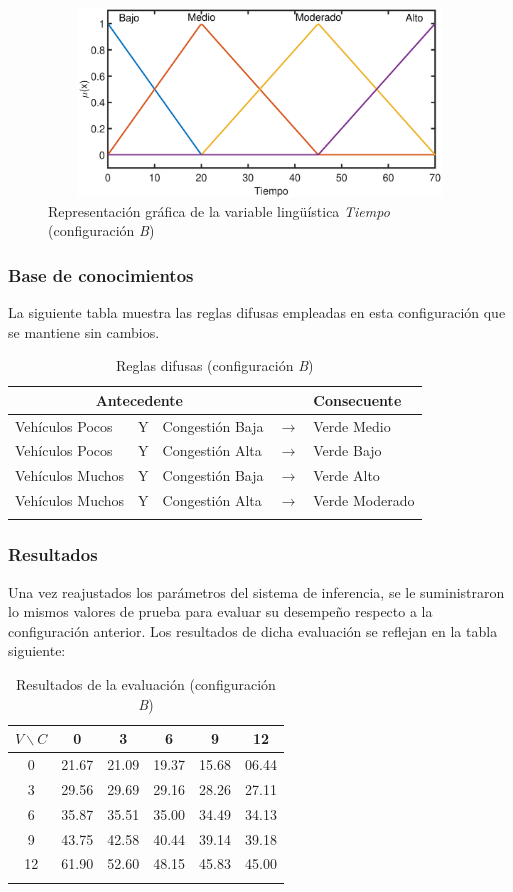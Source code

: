 \begin{figure}[H]
	\centering
	\includegraphics[height=5cm, width=12cm]{Variables/ConfigB_output1.eps}
	\caption{Representación gráfica de la variable lingüística \textit{Tiempo} (configuración \textit{B})}
\end{figure}

\subsubsection{Base de conocimientos}
La siguiente tabla muestra las reglas difusas empleadas en esta configuración que se mantiene sin cambios.
\begin{longtable}[c]{lclcl} \toprule
	\multicolumn{3}{c}{Antecedente} & & Consecuente \\ \midrule
	Vehículos Pocos & Y & Congestión Baja& $\rightarrow$ & Verde Medio \\
	Vehículos Pocos & Y & Congestión Alta& $\rightarrow$ & Verde Bajo \\
	Vehículos Muchos &Y& Congestión Baja& $\rightarrow$ & Verde Alto \\
	Vehículos Muchos &Y& Congestión Alta& $\rightarrow$ & Verde Moderado \\ \hline
	\caption{Reglas difusas (configuración \textit{B})}
\end{longtable}

\pagebreak
\subsubsection{Resultados}
Una vez reajustados los parámetros del sistema de inferencia, se le suministraron lo mismos valores de prueba para evaluar su desempeño respecto a la configuración anterior. Los resultados de dicha evaluación se reflejan en la tabla siguiente:

\begin{longtable}[c]{cccccc} \toprule
	$V \backslash C$ &  0 & 3 & 6 & 9 & 12 \\ \midrule
	0 & 21.67 & 21.09 & 19.37 & 15.68 & 06.44 \\
	3 & 29.56 & 29.69 & 29.16 & 28.26 & 27.11 \\
	6 & 35.87 & 35.51 & 35.00 & 34.49 & 34.13 \\
	9 & 43.75 & 42.58 & 40.44 & 39.14 & 39.18 \\
	12& 61.90 & 52.60 & 48.15 & 45.83 & 45.00 \\
	\caption{Resultados de la evaluación (configuración \textit{B})}
\end{longtable}


